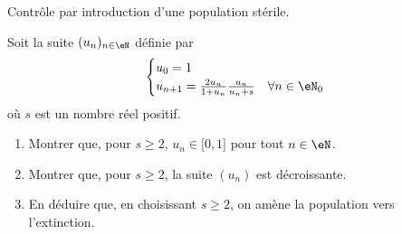 
\begin{exercice}\label{exoTD3-0010}

	Contrôle par introduction d'une population stérile.

	Soit la suite $(u_n)_{n\in\eN}$ définie par
	\begin{equation}
		\begin{cases}
			u_0=1	&\\
			u_{n+1}=\frac{ 2u_n }{ 1+u_n }\frac{ u_n }{ u_n+s }	&	\text{}\forall n\in\eN_0
		\end{cases}
	\end{equation}
	où $s$ est un nombre réel positif.
	\begin{enumerate}
		\item
			Montrer que, pour $s\geq 2$, $u_n\in\mathopen[ 0 , 1 \mathclose]$ pour tout $n\in\eN$.
		\item
			Montrer que,  pour $s\geq 2$, la suite $(u_n)$ est décroissante.
		\item
			En déduire que, en choisissant $s\geq 2$, on amène la population vers l'extinction.

	\end{enumerate}

\end{exercice}

